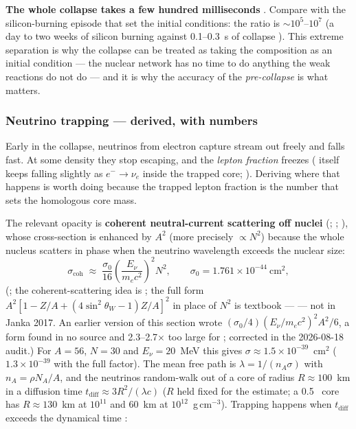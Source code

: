 \textbf{The whole collapse takes a few hundred milliseconds}
. Compare with the
silicon-burning episode that set the initial conditions: the ratio is
$\sim 10^5$--$10^7$ (a day to two weeks of silicon burning against 0.1--0.3~s of
collapse \typical). This extreme separation is why the collapse can be treated
as taking the composition as an initial condition --- the nuclear network has
no time to do anything the weak reactions do not do --- and it is why the
accuracy of the \emph{pre-collapse} \Ye{} is what matters.

\subsubsection{Neutrino trapping --- derived, with numbers}
\label{sec:trapping}

Early in the collapse, neutrinos from electron capture stream out freely and
\Ye{} falls fast. At some density they stop escaping, and the \emph{lepton
fraction} \Yl{} freezes (\Ye{} itself keeps falling slightly as $e^- \to \nu_e$
inside the trapped core; \citealt{janka2017}). Deriving where that happens is
worth doing because the trapped lepton fraction is the number that sets the
homologous core mass.

The relevant opacity is \textbf{coherent neutral-current scattering off nuclei}
(\citealt{freedman1974}; \citealt{langanke2003a}; \citealt{janka2017}), whose
cross-section is enhanced by $A^2$ (more precisely $\propto N^2$) because the
whole nucleus scatters in phase when the neutrino wavelength exceeds the
nuclear size:
%
\begin{equation}
\sigma_{\mathrm{coh}} \;\approx\; \frac{\sigma_0}{16}\left(\frac{E_\nu}{m_ec^2}\right)^{2} N^{2},
\qquad \sigma_0 = 1.761\times10^{-44}\ \mathrm{cm}^2 ,
\label{eq:sigmacoh}
\end{equation}
%
(\citealt{janka2017}; the coherent-scattering idea is \citealt{freedman1974};
the full form $A^2[1 - Z/A + (4 \sin^2\theta_W - 1) Z/A]^2$ in place of $N^2$
is textbook --- \citealt[\S 18.4]{shapiro1983} --- not in Janka 2017. An
earlier version of this section wrote $(\sigma_0/4)(E_\nu/m_ec^2)^2 A^2/6$, a
form found in no source and 2.3--2.7$\times$ too large for ;
corrected in the 2026-08-18 audit.) For $A = 56$, $N = 30$ and $E_\nu = 20$~MeV
this gives $\sigma \approx 1.5 \times 10^{-39}$~cm$^2$ ($1.3 \times 10^{-39}$
with the full factor). The mean free path is $\lambda = 1/(n_A \sigma)$ with
$n_A = \rho N_A/A$, and the neutrinos random-walk out of a core of radius
$R \approx 100$~km in a diffusion time $t_{\mathrm{diff}} \approx 3R^2/(\lambda c)$
($R$ held fixed for the estimate; a 0.5~\Msun{} core has $R \approx 130$~km at
$10^{11}$ and 60~km at $10^{12}$~g\,cm$^{-3}$). Trapping happens when
$t_{\mathrm{diff}}$ exceeds the dynamical time \tff:

